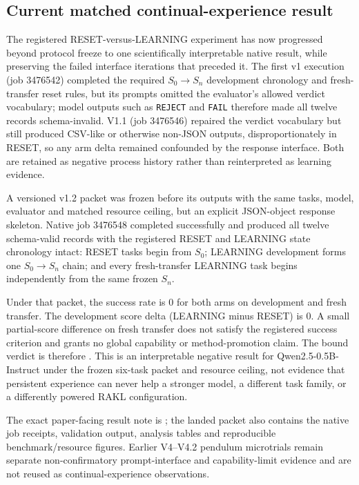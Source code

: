 \subsection{Current matched continual-experience result}

The registered RESET-versus-LEARNING experiment has now progressed beyond protocol freeze to one scientifically interpretable native result, while preserving the failed interface iterations that preceded it.  The first v1 execution (job 3476542) completed the required $S_0\rightarrow S_n$ development chronology and fresh-transfer reset rules, but its prompts omitted the evaluator's allowed verdict vocabulary; model outputs such as \texttt{REJECT} and \texttt{FAIL} therefore made all twelve records schema-invalid.  V1.1 (job 3476546) repaired the verdict vocabulary but still produced CSV-like or otherwise non-JSON outputs, disproportionately in RESET, so any arm delta remained confounded by the response interface.  Both are retained as negative process history rather than reinterpreted as learning evidence.

A versioned v1.2 packet was frozen before its outputs with the same
tasks, model, evaluator and matched resource ceiling, but an explicit
JSON-object response skeleton.  Native job 3476548 completed successfully
and produced all twelve schema-valid records with the registered RESET and
LEARNING state chronology intact: RESET tasks begin from $S_0$; LEARNING
development forms one $S_0\rightarrow S_n$ chain; and every fresh-transfer
LEARNING task begins independently from the same frozen $S_n$.

Under that packet, the success rate is 0 for both arms on development and
fresh transfer.  The development score delta (LEARNING minus RESET) is 0.
A small partial-score difference on fresh transfer does not satisfy the
registered success criterion and grants no global capability or
method-promotion claim.  The bound verdict is therefore
.
This is an interpretable negative result for Qwen2.5-0.5B-Instruct under
the frozen six-task packet and resource ceiling, not evidence that
persistent experience can never help a stronger model, a different task
family, or a differently powered RAKL configuration.

The exact paper-facing result note is
;
the landed packet also contains the native job receipts, validation
output, analysis tables and reproducible benchmark/resource figures.
Earlier V4--V4.2 pendulum microtrials remain separate non-confirmatory
prompt-interface and capability-limit evidence and are not reused as
continual-experience observations.

